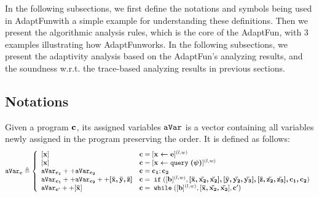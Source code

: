 \documentclass[a4paper,11pt]{article}
\newcommand{\THESYSTEM}{\textsf{AdaptFun}}
\begin{document}
In the following subsections, 
we first define the notations and symbols being used in \THESYSTEM  with a simple example for understanding these definitions. 
Then we present the algorithmic analysis rules, which is the core of the \THESYSTEM, with
3 examples illustrating how \THESYSTEM  works.
In the following subsections, we present the adaptivity analysis based on the \THESYSTEM's analyzing results, and the soundness w.r.t. the trace-based analyzing results in previous sections.

\subsection{Notations}
%
\label{subsec:alg_notation}
%
\begin{defn}
Given a program ${\boldsymbol{\mathbf{c}}}$, its assigned variables $\mathtt{aVar}$ is a vector containing all variables newly assigned in the program preserving the order. 
It is defined as follows:
$$
  \avar_{\ssa{c}} \triangleq
  \left\{
  \begin{array}{ll}
   		[\ssa{x}] 									
   		& \ssa{c} = [\ssa{\assign x e}]^{(l, w)} 
   		\\
     	\left[ \ssa{x} \right] 									
     	& \ssa{c} = [\ssa{\assign x \query(\qexpr)}]^{(l, w)} 
     	\\
     	\avar_{\ssa{c_1}} ++ \avar_{\ssa{c_2}} 	
     	& \ssa{c} = \ssa{c_1};\ssa{c_2}
     	\\
     	\avar_{\ssa{c_1}} ++ \avar_{\ssa{c_2}} ++ \ssa{[\bar{x}, \bar{y}, \bar{z}]} 
     	& \ssa{c} =\eif([\sbexpr]^{(l, w)} , \ssa{[\bar{x}, \bar{x_2}, \bar{x_2}], 
     	[\bar{y}, \bar{y_2}, \bar{y_3}], 
     	[\bar{z}, \bar{z_2}, \bar{z_3}], c_1, c_2}) 
     	\\
     	\avar_{\ssa{c}'} ++ [\ssa{\bar{x}}]
     	& \ssa{c} 	= \ewhile ([\sbexpr]^{(l, w)}, [\ssa{\bar{x}, \bar{x_2}, \bar{x_2}}], \ssa{c}')
\end{array}
\right.
$$
\end{defn}
%
%
\end{document}
